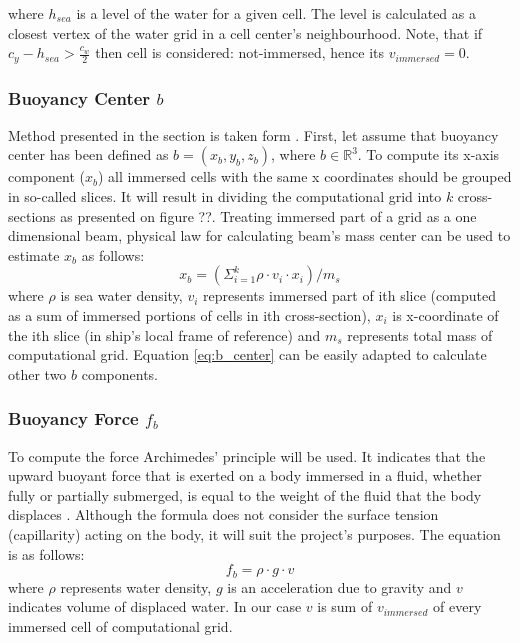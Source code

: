 \documentclass{report}
\begin{document}
where $h_{sea}$ is a level of the water for a given cell. The level is calculated as a closest vertex of the water grid in a cell center's neighbourhood. Note, that if $c_y - h_{sea} > \frac{c_w}{2}$ then cell is considered: not-immersed, hence its $v_{immersed} = 0$.

\subsubsection{Buoyancy Center $b$}
Method presented in the section is taken form \cite{second_paper}. First, let assume that buoyancy center has been defined as $b = (x_b, y_b, z_b)$, where $b \in \mathbb{R}^3$. To compute its x-axis component ($x_b$) all immersed cells with the same x coordinates should be grouped in so-called slices. It will result in dividing the computational grid into $k$ cross-sections as presented on figure ??. Treating immersed part of a grid as a one dimensional beam, physical law for calculating beam's mass center can be used to estimate $x_b$ as follows:
\begin{equation}\label{eq:b_center}
x_b = (\Sigma_{i=1}^{k} \rho \cdot v_i \cdot x_i)  / m_s
\end{equation} 
where $\rho$ is sea water density, $v_i$ represents immersed part of ith slice (computed as a sum of immersed portions of cells in ith cross-section), $x_i$ is x-coordinate of the ith slice (in ship's local frame of reference) and $m_s$ represents total mass of computational grid. Equation \ref{eq:b_center} can be easily adapted to calculate other two $b$ components. 
\subsubsection{Buoyancy Force $f_b$}
To compute the force Archimedes' principle will be used. It indicates that the upward buoyant force that is exerted on a body immersed in a fluid, whether fully or partially submerged, is equal to the weight of the fluid that the body displaces \cite{arch}. Although the formula does not consider the surface tension (capillarity) acting on the body, it will suit the project's purposes. The equation is as follows:
\begin{equation}
f_b = \rho \cdot g \cdot v
\end{equation}
where $\rho$ represents water density, $g$ is an acceleration due to gravity and $v$ indicates volume of displaced water. In our case $v$ is sum of $v_{immersed}$ of every immersed cell of computational grid. 
\end{document}
